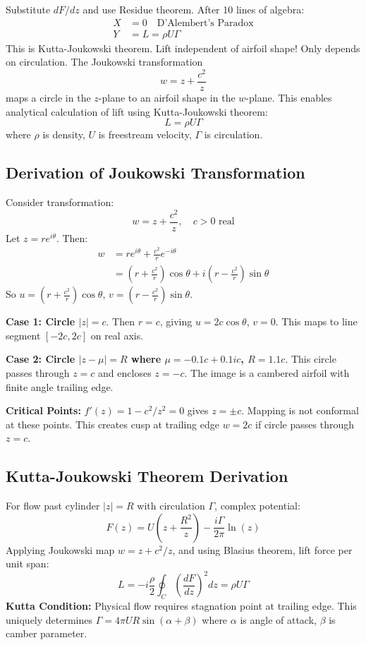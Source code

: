 \documentclass[12pt,a4paper]{article}
\begin{document}
Substitute $dF/dz$ and use Residue theorem. After 10 lines of algebra:
\begin{align}
X &= 0 \quad \text{D'Alembert's Paradox} \\
Y &= L = \rho U \Gamma
\end{align}
This is Kutta-Joukowski theorem. Lift independent of airfoil shape! Only depends on circulation.
The Joukowski transformation 
\begin{equation}
w = z + \frac{c^2}{z}
\end{equation}
maps a circle in the $z$-plane to an airfoil shape in the $w$-plane. This enables analytical calculation of lift using Kutta-Joukowski theorem:
\begin{equation}
L = \rho U \Gamma
\end{equation}
where $\rho$ is density, $U$ is freestream velocity, $\Gamma$ is circulation.
\subsection{Derivation of Joukowski Transformation}
Consider transformation:
\begin{equation}
w = z + \frac{c^2}{z}, \quad c > 0 \text{ real}
\end{equation}
Let $z = re^{i\theta}$. Then:
\begin{align}
w &= re^{i\theta} + \frac{c^2}{r}e^{-i\theta} \\
&= \left(r + \frac{c^2}{r}\right)\cos\theta + i\left(r - \frac{c^2}{r}\right)\sin\theta
\end{align}
So $u = \left(r + \frac{c^2}{r}\right)\cos\theta$, $v = \left(r - \frac{c^2}{r}\right)\sin\theta$.

\textbf{Case 1: Circle $|z| = c$}. Then $r=c$, giving $u = 2c\cos\theta$, $v = 0$. This maps to line segment $[-2c, 2c]$ on real axis.

\textbf{Case 2: Circle $|z - \mu| = R$ where $\mu = -0.1c + 0.1ic$, $R=1.1c$}. This circle passes through $z=c$ and encloses $z=-c$. The image is a cambered airfoil with finite angle trailing edge.

\textbf{Critical Points:} $f'(z) = 1 - c^2/z^2 = 0$ gives $z = \pm c$. Mapping is not conformal at these points. This creates cusp at trailing edge $w=2c$ if circle passes through $z=c$.

\subsection{Kutta-Joukowski Theorem Derivation}
For flow past cylinder $|z|=R$ with circulation $\Gamma$, complex potential:
\begin{equation}
F(z) = U\left(z + \frac{R^2}{z}\right) - \frac{i\Gamma}{2\pi}\ln(z)
\end{equation}
Applying Joukowski map $w = z + c^2/z$, and using Blasius theorem, lift force per unit span:
\begin{equation}
L = -i\frac{\rho}{2}\oint_C \left(\frac{dF}{dz}\right)^2 dz = \rho U \Gamma
\end{equation}
\textbf{Kutta Condition:} Physical flow requires stagnation point at trailing edge. This uniquely determines $\Gamma = 4\pi U R \sin(\alpha + \beta)$ where $\alpha$ is angle of attack, $\beta$ is camber parameter.
\end{document}
